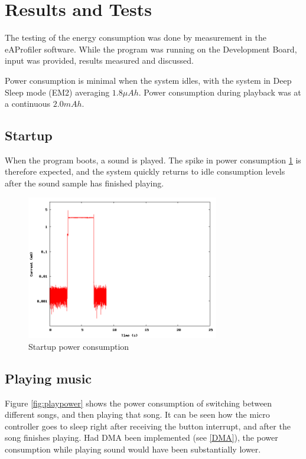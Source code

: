 \section{Results and Tests}

The testing of the energy consumption was done by measurement in the eAProfiler software.
While the program was running on the Development Board, input was provided, results measured and discussed.

Power consumption is minimal when the system idles, with the system in Deep Sleep mode (EM2) averaging $ 1.8 \mu Ah $. Power consumption during playback was at a continuous $ 2.0 mAh $.

\subsection{Startup}

When the program boots, a sound is played. The spike in power consumption \ref{fig:startuppower} is therefore expected, and the system quickly returns to idle consumption levels after the sound sample has finished playing.

\begin{figure}[H]
\centering
\includegraphics[width=0.75\textwidth]{data/startup.png}
\caption{Startup power consumption}
\label{fig:startuppower}
\end{figure}

\subsection{Playing music}

Figure \ref{fig:playpower} shows the power consumption of switching between different songs, and then playing that song.
It can be seen how the micro controller goes to sleep right after receiving the button interrupt, and after the song finishes playing.
Had DMA been implemented (see \vref{DMA}), the power consumption while playing sound would have been substantially lower.


